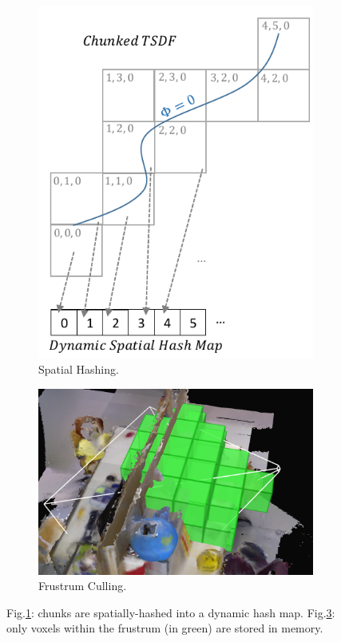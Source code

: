 \documentclass[conference]{IEEEtran}
\newcommand{\figref}[1]{Fig.\ref{#1}}
\begin{document}
\begin{figure}[t!]
 	  	\begin{subfigure}[b]{0.45\linewidth} \centering
 	    \includegraphics[width=1.0\textwidth]{img/chunks.pdf}
 	      \caption{Spatial Hashing.}
 	  	\label{fig:chunks} 
 	  \end{subfigure} 
 	  \begin{subfigure}[b]{0.55\linewidth} \centering
 	  	  \hspace{-5em}
	      \includegraphics[width=1.0\textwidth]{img/frustum_cull}
	      \caption{Frustrum Culling.}
	 	 \label{fig:frustum_cull}
	  \end{subfigure}
	  \caption{\figref{fig:chunks}: chunks are spatially-hashed \cite{SpatialHashing} into a
      dynamic hash map. 
      \figref{fig:frustum_cull}: only voxels within the frustrum (in green) are stored in memory.}
\end{figure} 
\end{document}
